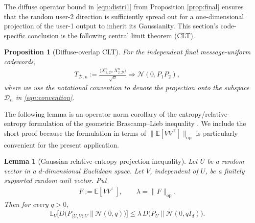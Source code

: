 \documentclass[11pt,onecolumn]{IEEEtran}
\newcommand{\calD}{\mathcal{D}}
\newcommand{\calN}{\mathcal{N}}
\newcommand{\bbE}{\mathbb{E}}
\newtheorem{lemma}[theorem]{Lemma}
\newtheorem{proposition}[theorem]{Proposition}
\begin{document}
The diffuse operator bound in \eqref{eqn:distri1} from Proposition \ref{prop:final} ensures that the random user-2 direction is sufficiently spread out for a one-dimensional projection of the user-1 output to inherit its Gaussianity. This section's code-specific conclusion is the following central limit theorem (CLT).  
\begin{proposition}[Diffuse-overlap CLT]\label{prop:diffuse_overlap}
For the independent final message-uniform codewords,
\begin{align}
    T_{\calD,n}:= \frac{\langle  X_{1,\calD}^n,  X_{2,\calD}^n\rangle}{\sqrt{n}} \Rightarrow \calN(0,P_1P_2), \label{eqn:conv_TD}
\end{align}
where we use the notational convention to denote the projection onto the subspace $\calD_n$ in \eqref{eqn:convention}.
\end{proposition}
The following lemma is an operator norm corollary of the
entropy/relative-entropy formulation of the geometric
Brascamp--Lieb inequality \cite{CarlenCorderoErausquin2009,LiuCourtadeCuffVerdu2016}.
We include the short proof because the formulation in terms of
$\|\mathbb E[VV^\top]\|_{\mathrm{op}}$ is particularly convenient
for the present application.
\begin{lemma}[Gaussian-relative entropy projection inequality] \label{lem:RE_proj}
    Let $U$ be a random vector in a $d$-dimensional Euclidean space. Let $V$, independent of $U$, be a finitely supported random unit vector. Put 
    \begin{align}
        F:=\mathbb E[VV^\top],\qquad\lambda= \| F \|_{\mathrm{op}}.
    \end{align}
    Then for every $q>0$,
    \begin{align}
        \bbE_V \Big[ D\big(P_{ \langle U,V \rangle | V} \|\calN(0,q) \big) \Big]\le \lambda \,   D\big(P_U\| \calN(0,q I_d) \big). \label{eqn:bl2}
    \end{align} 
\end{lemma}
\end{document}
